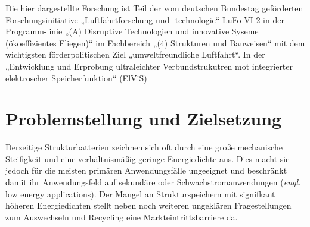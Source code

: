 Die hier dargestellte Forschung ist Teil der vom deutschen Bundestag geförderten Forschungsinitiative „Luftfahrtforschung und -technologie“ LuFo-VI-2 in der Programm-linie „(A) Disruptive Technologien und innovative Syseme (ökoeffizientes Fliegen)“ im Fachbereich „(4) Strukturen und Bauweisen“ mit dem wichtigsten förderpolitischen Ziel „umweltfreundliche Luftfahrt“. In der „Entwicklung und Erprobung ultraleichter Verbundstrukutren mot integrierter elektroscher Speicherfunktion“ (ElViS)


\section{\label{sec:Motivation_Zielstellung}Problemstellung und Zielsetzung}



Derzeitige Strukturbatterien zeichnen sich oft durch eine große mechanische Steifigkeit und eine verhältnismäßig geringe Energiedichte aus. Dies macht sie jedoch für die meisten primären Anwendungsfälle ungeeignet und beschränkt damit ihr Anwendungsfeld auf sekundäre oder Schwachstromanwendungen (\textit{engl.} low energy applications). Der Mangel an Strukturspeichern mit signifkant höheren Energiedichten stellt neben noch weiteren ungeklären Fragestellungen zum Auswechseln und Recycling eine Markteintrittsbarriere da.

